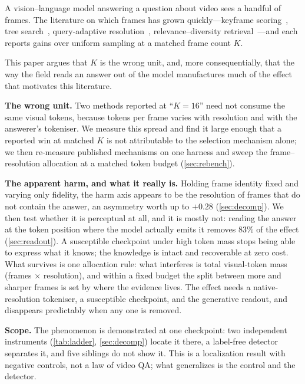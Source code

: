 \documentclass[10pt,twocolumn,letterpaper]{article}
\begin{document}
A vision--language model answering a question about video sees a handful of frames. The literature on which frames has grown quickly---keyframe scoring~\cite{tang2025aks}, tree search~\cite{wang2025videotree}, query-adaptive resolution~\cite{zhang2025qframe}, relevance--diversity retrieval~\cite{carbonell1998mmr}---and each reports gains over uniform sampling at a matched frame count $K$.

This paper argues that $K$ is the wrong unit, and, more consequentially, that the way the field reads an answer out of the model manufactures much of the effect that motivates this literature.

\noindent\textbf{The wrong unit.} Two methods reported at ``$K{=}16$'' need not consume the same visual tokens, because tokens per frame varies with resolution and with the answerer's tokeniser. We measure this spread and find it large enough that a reported win at matched $K$ is not attributable to the selection mechanism alone; we then re-measure published mechanisms on one harness and sweep the frame--resolution allocation at a matched token budget (\cref{sec:rebench}).

\noindent\textbf{The apparent harm, and what it really is.} Holding frame identity fixed and varying only fidelity, the harm axis appears to be the resolution of frames that do not contain the answer, an asymmetry worth up to $+0.28$ (\cref{sec:decomp}). We then test whether it is perceptual at all, and it is mostly not: reading the answer at the token position where the model actually emits it removes 83\% of the effect (\cref{sec:readout}). A susceptible checkpoint under high token mass stops being able to express what it knows; the knowledge is intact and recoverable at zero cost. What survives is one allocation rule: what interferes is total visual-token mass (frames $\times$ resolution), and within a fixed budget the split between more and sharper frames is set by where the evidence lives. The effect needs a native-resolution tokeniser, a susceptible checkpoint, and the generative readout, and disappears predictably when any one is removed.

\noindent\textbf{Scope.} The phenomenon is demonstrated at one checkpoint: two independent instruments (\cref{tab:ladder}, \cref{sec:decomp}) locate it there, a label-free detector separates it, and five siblings do not show it. This is a localization result with negative controls, not a law of video QA; what generalizes is the control and the detector.
\end{document}
